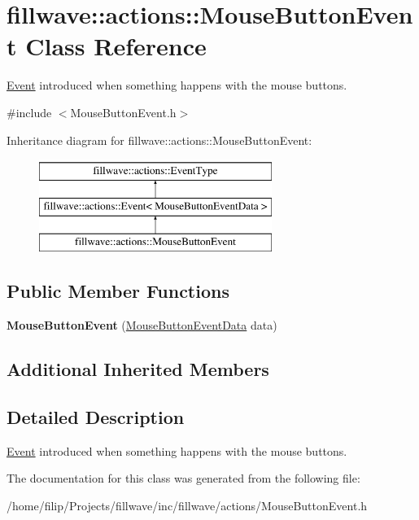 \hypertarget{classfillwave_1_1actions_1_1MouseButtonEvent}{}\section{fillwave\+:\+:actions\+:\+:Mouse\+Button\+Event Class Reference}
\label{classfillwave_1_1actions_1_1MouseButtonEvent}


\hyperlink{classfillwave_1_1actions_1_1Event}{Event} introduced when something happens with the mouse buttons.  




{\ttfamily \#include $<$Mouse\+Button\+Event.\+h$>$}

Inheritance diagram for fillwave\+:\+:actions\+:\+:Mouse\+Button\+Event\+:\begin{figure}[H]
\begin{center}
\leavevmode
\includegraphics[height=3.000000cm]{classfillwave_1_1actions_1_1MouseButtonEvent}
\end{center}
\end{figure}
\subsection*{Public Member Functions}
\begin{DoxyCompactItemize}
\item 
\hypertarget{classfillwave_1_1actions_1_1MouseButtonEvent_a07a91e9d24b83c49cea27a6952813362}{}{\bfseries Mouse\+Button\+Event} (\hyperlink{structfillwave_1_1actions_1_1MouseButtonEventData}{Mouse\+Button\+Event\+Data} data)\label{classfillwave_1_1actions_1_1MouseButtonEvent_a07a91e9d24b83c49cea27a6952813362}

\end{DoxyCompactItemize}
\subsection*{Additional Inherited Members}


\subsection{Detailed Description}
\hyperlink{classfillwave_1_1actions_1_1Event}{Event} introduced when something happens with the mouse buttons. 

The documentation for this class was generated from the following file\+:\begin{DoxyCompactItemize}
\item 
/home/filip/\+Projects/fillwave/inc/fillwave/actions/Mouse\+Button\+Event.\+h\end{DoxyCompactItemize}
